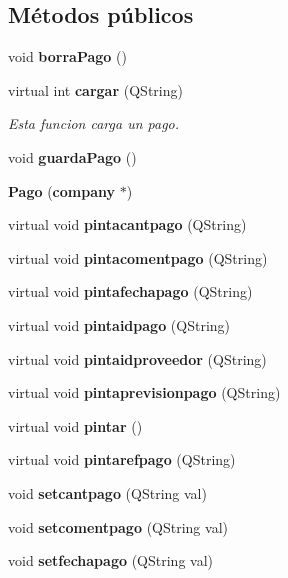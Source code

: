 \subsection*{M\'{e}todos p\'{u}blicos}
\begin{CompactItemize}
\item 
void {\bf borra\-Pago} ()\label{classPago_a0}

\item 
virtual int {\bf cargar} (QString)\label{classPago_a1}

\begin{CompactList}\small\item\em Esta funcion carga un pago. \item\end{CompactList}\item 
void {\bf guarda\-Pago} ()\label{classPago_a2}

\item 
{\bf Pago} ({\bf company} $\ast$)\label{classPago_a3}

\item 
virtual void {\bf pintacantpago} (QString)\label{classPago_a4}

\item 
virtual void {\bf pintacomentpago} (QString)\label{classPago_a5}

\item 
virtual void {\bf pintafechapago} (QString)\label{classPago_a6}

\item 
virtual void {\bf pintaidpago} (QString)\label{classPago_a7}

\item 
virtual void {\bf pintaidproveedor} (QString)\label{classPago_a8}

\item 
virtual void {\bf pintaprevisionpago} (QString)\label{classPago_a9}

\item 
virtual void {\bf pintar} ()\label{classPago_a10}

\item 
virtual void {\bf pintarefpago} (QString)\label{classPago_a11}

\item 
void {\bf setcantpago} (QString val)\label{classPago_a12}

\item 
void {\bf setcomentpago} (QString val)\label{classPago_a13}

\item 
void {\bf setfechapago} (QString val)\label{classPago_a14}


\end{CompactItemize}
